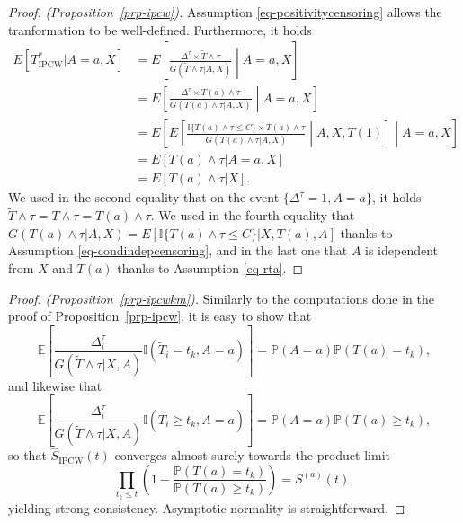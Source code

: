 \documentclass[
  11pt,
  a4paper,
]{article}
\theoremstyle{plain}
\theoremstyle{plain}
\theoremstyle{plain}
\theoremstyle{definition}
\theoremstyle{remark}
\begin{document}
\begin{proof}
\emph{(Proposition~\ref{prp-ipcw}).} Assumption
\ref{eq-positivitycensoring} allows the tranformation to be
well-defined. Furthermore, it holds \begin{align*}
E[T^*_{\mathrm{IPCW}}|A=a,X] 
&= E\left[\frac{ \Delta^\tau \times\widetilde T \wedge \tau}{G(\widetilde T \wedge \tau | A,X)} \middle | A = a,X\right]  \\
&= E\left[\frac{ \Delta^\tau \times T(a) \wedge \tau}{G(T(a) \wedge \tau | A,X)} \middle | A = a,X\right]\\
&= E\left[ E\left[\frac{ \mathbb{I}\{T(a)\wedge \tau \leqslant C \} \times T(a) \wedge \tau}{G(T(a) \wedge \tau | A,X)}\middle| A, X,T(1) \right] \middle | A = a,X\right] \\
&= E\left[T(a) \wedge \tau|A=a, X\right] \\
&= E\left[T(a) \wedge \tau | X \right].
\end{align*} We used in the second equality that on the event
\(\{\Delta^\tau=1, A=a\}\), it holds
\(\widetilde T \wedge \tau =  T \wedge \tau = T(a) \wedge \tau\). We
used in the fourth equality that
\(G(T(a) \wedge \tau | A,X) = E[\mathbb{I}\{T(a) \wedge \tau \leqslant C\}|X,T(a),A]\)
thanks to Assumption \ref{eq-condindepcensoring}, and in the last one
that \(A\) is idependent from \(X\) and \(T(a)\) thanks to Assumption
\ref{eq-rta}.
\end{proof}

\begin{proof}
\emph{(Proposition~\ref{prp-ipcwkm}).} Similarly to the computations
done in the proof of Proposition~\ref{prp-ipcw}, it is easy to show that
\[
\mathbb{E}\left[\frac{\Delta_i^\tau}{G(\widetilde T \wedge\tau | X,A)} \mathbb{I}(\widetilde T_i = t_k, A=a)\right] = \mathbb{P}(A=a) \mathbb{P}(T(a) = t_k),
\] and likewise that \[
\mathbb{E}\left[\frac{\Delta_i^\tau}{G(\widetilde T \wedge\tau | X,A)} \mathbb{I}(\widetilde T_i \geqslant t_k, A=a)\right] = \mathbb{P}(A=a) \mathbb{P}(T(a) \geqslant t_k),
\] so that \(\widehat S_{\mathrm{IPCW}}(t)\) converges almost surely
towards the product limit \[
\prod_{t_k \leqslant t} \left(1-\frac{\mathbb{P}(T(a) = t_k)}{\mathbb{P}(T(a) \geqslant t_k)}\right) = S^{(a)}(t),
\] yielding strong consistency. Asymptotic normality is straightforward.
\end{proof}
\end{document}
